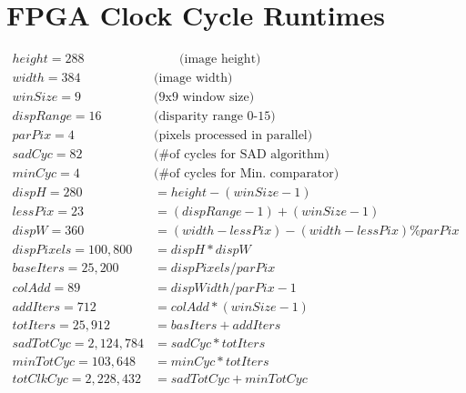 \section{FPGA Clock Cycle Runtimes}

\begin{subequations}
\begin{align} 	\label{eq:clockCycles}
	height = 288	& \qquad \text{(image height)}\\
	width = 384 	\qquad & \text{(image width)}\\
	winSize = 9	 	\qquad & \text{(9x9 window size)}\\
	dispRange = 16 	\qquad & \text{(disparity range 0-15)}\\
	parPix = 4 		\qquad & \text{(pixels processed in parallel)}\\
	sadCyc = 82		\qquad & \text{(\# of cycles for SAD algorithm)}\\
	minCyc = 4		\qquad & \text{(\# of cycles for Min. comparator)}\\
	dispH = 280 &= height - (winSize - 1) \\
	lessPix = 23 &= (dispRange-1) + (winSize-1) \\
	dispW = 360 &= (width-lessPix) - (width-lessPix) \% parPix \\
	dispPixels = 100,800 &= dispH * dispW \\
	baseIters = 25,200 &= dispPixels / parPix \\
	colAdd = 89 &= dispWidth / parPix - 1 \\
	addIters = 712 &= colAdd * (winSize-1) \\
	totIters = 25,912 &= basIters + addIters \\
	sadTotCyc = 2,124,784 &= sadCyc * totIters \\
	minTotCyc = 103,648 &= minCyc * totIters \\
	totClkCyc = 2,228,432 &= sadTotCyc + minTotCyc
\end{align}
\end{subequations}


